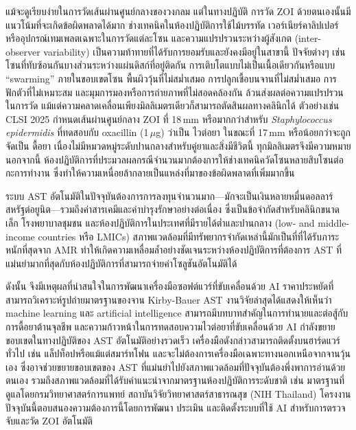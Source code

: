 แม้จะดูเรียบง่ายในการวัดเส้นผ่านศูนย์กลางของวงกลม แต่ในทางปฏิบัติ การวัด ZOI ด้วยตนเองนั้นมีแนวโน้มที่จะเกิดข้อผิดพลาดได้มาก ช่างเทคนิคในห้องปฏิบัติการใช้ไม้บรรทัด เวอร์เนียร์คาลิปเปอร์ หรืออุปกรณ์เทมเพลตเฉพาะในการวัดแต่ละโซน และความแปรปรวนระหว่างผู้สังเกต (inter-observer variability) เป็นความท้าทายที่ได้รับการยอมรับและยังคงมีอยู่ในสาขานี้ \cite{humphries2018} ปัจจัยต่างๆ เช่น โซนที่ทับซ้อนกันบางส่วนระหว่างแผ่นดิสก์ที่อยู่ติดกัน การเติบโตแบบไม่เป็นเนื้อเดียวกันหรือแบบ ``swarming'' ภายในขอบเขตโซน พื้นผิววุ้นที่ไม่สม่ำเสมอ การปลูกเชื้อบนจานที่ไม่สม่ำเสมอ การฟักตัวที่ไม่เหมาะสม และมุมการมองหรือการถ่ายภาพที่ไม่สอดคล้องกัน ล้วนส่งผลต่อความแปรปรวนในการวัด แม้แต่ความคลาดเคลื่อนเพียงมิลลิเมตรเดียวก็สามารถตัดสินผลทางคลินิกได้ ตัวอย่างเช่น CLSI 2025 กำหนดเส้นผ่านศูนย์กลาง ZOI ที่ 18\,mm หรือมากกว่าสำหรับ \textit{Staphylococcus epidermidis} ที่ทดสอบกับ oxacillin (1\,$\mu$g) ว่าเป็น ไวต่อยา ในขณะที่ 17\,mm หรือน้อยกว่าจะถูกจัดเป็น ดื้อยา เนื่องไม่มีหมวดหมู่ระดับปานกลางสำหรับคู่ยาและสิ่งมีชีวิตนี้ ทุกมิลลิเมตรจึงมีความหมาย นอกจากนี้ ห้องปฏิบัติการที่ประมวลผลกรณีจำนวนมากต้องการให้ช่างเทคนิควัดโซนหลายสิบโซนต่อกะการทำงาน ซึ่งทำให้ความเหนื่อยล้ากลายเป็นแหล่งที่มาของข้อผิดพลาดที่เพิ่มมากขึ้น

ระบบ AST อัตโนมัติในปัจจุบันต้องการการลงทุนจำนวนมาก---มักจะเป็นเงินหลายหมื่นดอลลาร์สหรัฐต่อยูนิต---รวมถึงค่าสารเคมีและค่าบำรุงรักษาอย่างต่อเนื่อง ซึ่งเป็นข้อจำกัดสำหรับคลินิกขนาดเล็ก โรงพยาบาลชุมชน และห้องปฏิบัติการในประเทศที่มีรายได้ต่ำและปานกลาง (low- and middle-income countries หรือ LMICs) สภาพแวดล้อมที่มีทรัพยากรจำกัดเหล่านี้มักเป็นที่ที่ได้รับภาระหนักที่สุดจาก AMR ทำให้เกิดความเหลื่อมล้ำอย่างชัดเจนระหว่างห้องปฏิบัติการที่ต้องการ AST ที่แม่นยำมากที่สุดกับห้องปฏิบัติการที่สามารถจ่ายค่าโซลูชันอัตโนมัติได้

ดังนั้น จึงมีเหตุผลที่น่าสนใจในการพัฒนาเครื่องมือซอฟต์แวร์ที่ขับเคลื่อนด้วย AI ราคาประหยัดที่สามารถวิเคราะห์รูปถ่ายมาตรฐานของจาน Kirby-Bauer AST งานวิจัยล่าสุดได้แสดงให้เห็นว่า machine learning และ artificial intelligence สามารถมีบทบาทสำคัญในการทำนายและต่อสู้กับการดื้อยาต้านจุลชีพ \cite{bilal2025} และความก้าวหน้าในการทดสอบความไวต่อยาที่ขับเคลื่อนด้วย AI กำลังขยายขอบเขตในทางปฏิบัติของ AST อัตโนมัติอย่างรวดเร็ว \cite{liao2025} เครื่องมือดังกล่าวสามารถติดตั้งบนฮาร์ดแวร์ทั่วไป เช่น แล็ปท็อปหรือแม้แต่สมาร์ทโฟน และจะไม่ต้องการเครื่องมือเฉพาะทางนอกเหนือจากจานวุ้นเอง ซึ่งอาจช่วยขยายขอบเขตของ AST ที่แม่นยำไปยังสภาพแวดล้อมที่ปัจจุบันต้องพึ่งพาการอ่านด้วยตนเอง รวมถึงสภาพแวดล้อมที่ได้รับคำแนะนำจากมาตรฐานห้องปฏิบัติการระดับชาติ เช่น มาตรฐานที่ดูแลโดยกรมวิทยาศาสตร์การแพทย์ สถาบันวิจัยวิทยาศาสตร์สาธารณสุข (NIH Thailand) \cite{dmsc_nih} โครงงานปัจจุบันนี้ตอบสนองความต้องการนี้โดยการพัฒนา ประเมิน และติดตั้งระบบที่ใช้ AI สำหรับการตรวจจับและวัด ZOI อัตโนมัติ

